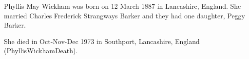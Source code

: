 
Phyllis May Wickham was born on 12 March 1887 in Lancashire, England.  She married Charles Frederick Strangways Barker and they had one daughter, Peggy Barker.  

She died in Oct-Nov-Dec 1973 in 	Southport, Lancashire, England (PhyllisWickhamDeath).

